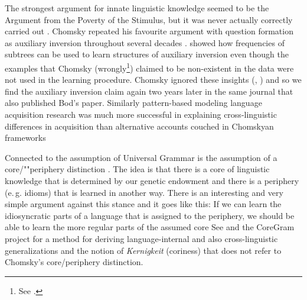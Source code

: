 The strongest argument for innate linguistic knowledge seemed to be the Argument from the Poverty of the Stimulus, but
it was never actually correctly carried out \citep{PS2002a,SP2002b}. Chomsky repeated his favourite argument
with question formation as auxiliary inversion throughout several decades \parencites[--33]{Chomsky71a-u}[]{Chomsky2013a}. \citet{Bod2009a} showed
how frequencies of subtrees can be used to learn structures of auxiliary inversion even though the
examples that Chomsky (wrongly\footnote{%
See \citet[--45]{PS2002a}.
}) claimed to be non-existent in the data were not used in the learning
procedure. Chomsky ignored these insights (\citealt*{BPYC2011a}, \citealt[]{Chomsky2013a}) and so we
find the auxiliary inversion claim again two years later in the same journal that also published Bod's paper.
Similarly pattern-based modeling language acquisition research was much more successful in explaining
cross-linguistic differences in acquisition than alternative accounts couched in Chomskyan
frameworks 
\iftoggle{long}{\citep{FPG2006a,FPAG2007a,FPG2009a}.}%
{\citep{FPAG2007a}.} 


Connected to the assumption of Universal Grammar is the assumption of a core/""periphery
distinction 
\iftoggle{long}{%
\parencites[\page 7--8]{Chomsky81a}[\page 150--151]{Chomsky86a}[\page 343]{Fodor98a}}{%
\parencites[\page 7--8]{Chomsky81a}}. The idea is that there is a core of linguistic knowledge that is determined by our
genetic endowment and there is a periphery (e.\,g. idioms) that is learned in another way. There is an interesting and very
simple argument against this stance and it goes like this: If we can learn the idiosyncratic parts of a language that is
assigned to the periphery, we should be able to learn the more regular parts of the assumed core
\iftoggle{long}{%
\parencites[\page 20]{Abney96a}[\page 222]{Goldberg2003b}[\page 14]{Goldberg2006a}[\page 100]{Newmeyer2005a}[\page 36]{Tomasello2006a}[\page
20]{Tomasello2006c}{MuellerKernigkeit}.}{%
\parencites[\page 20]{Abney96a}[\page 14]{Goldberg2006a}[\page 100]{Newmeyer2005a}[\page
20]{Tomasello2006c}{MuellerKernigkeit}.} 
See  and the CoreGram project \citep{MuellerCoreGram}
for a method for deriving language-internal and also cross-linguistic generalizations and the notion
of \emph{Kernigkeit} (coriness) that does not refer to Chomsky's core/periphery distinction. 

